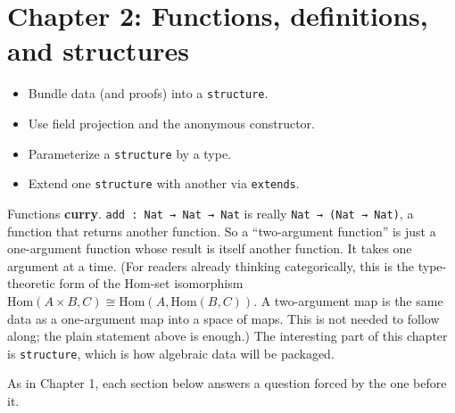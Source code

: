 \chapter{Chapter 2: Functions, definitions, and structures}\label{sec:02-functions-and-structures:00-index:1}

\begin{learningobjectives}
\begin{itemize}
\tightlist
\item
  Bundle data (and proofs) into a \texttt{structure}.
\item
  Use field projection and the anonymous constructor.
\item
  Parameterize a \texttt{structure} by a type.
\item
  Extend one \texttt{structure} with another via \texttt{extends}.
\end{itemize}
\end{learningobjectives}


Functions \textbf{curry}. \texttt{add : Nat → Nat → Nat} is really \texttt{Nat → (Nat → Nat)}, a function that returns another function. So a ``two-argument function'' is just a one-argument function whose result is itself another function. It takes one argument at a time. (For readers already thinking categorically, this is the type-theoretic form of the Hom-set isomorphism \(\mathrm{Hom}(A\times B, C)\cong\mathrm{Hom}(A,\mathrm{Hom}(B,C))\). A two-argument map is the same data as a one-argument map into a space of maps. This is not needed to follow along; the plain statement above is enough.) The interesting part of this chapter is \texttt{structure}, which is how algebraic data will be packaged.

As in Chapter 1, each section below answers a question forced by the one before it.

